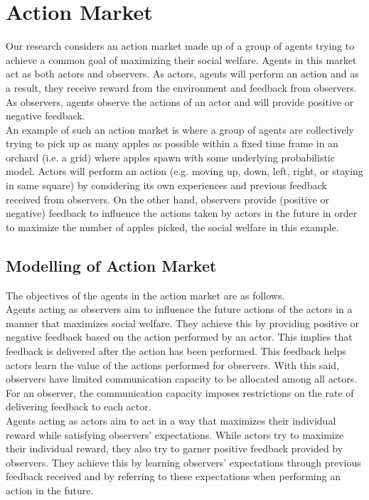 \section{Action Market}
\noindent Our research considers an action market made up of a group of agents trying to achieve a common goal of maximizing their social welfare. Agents in this market act as both actors and observers. As actors, agents will perform an action and as a result, they receive reward from the environment and feedback from observers. As observers, agents observe the actions of an actor and will provide positive or negative feedback. \\


\noindent An example of such an action market is where a group of agents are collectively trying to pick up as many apples as possible within a fixed time frame in an orchard (i.e. a grid) where apples spawn with some underlying probabilistic model. Actors will perform an action (e.g. moving up, down, left, right, or staying in same square) by considering its own experiences and previous feedback received from observers. On the other hand, observers provide (positive or negative) feedback to influence the actions taken by actors in the future in order to maximize the number of apples picked, the social welfare in this example. 

\subsection{Modelling of Action Market}

The objectives of the agents in the action market are as follows. \\

\noindent Agents acting as observers aim to influence the future actions of the actors in a manner that maximizes social welfare. They achieve this by providing positive or negative feedback based on the action performed by an actor. This implies that feedback is delivered after the action has been performed. This feedback helps actors learn the value of the actions performed for observers. With this said, observers have limited communication capacity to be allocated among all actors. For an observer, the communication capacity imposes restrictions on the rate of delivering feedback to each actor. \\ 

\noindent Agents acting as actors aim to act in a way that maximizes their individual reward while satisfying observers' expectations. While actors try to maximize their individual reward, they also try to garner positive feedback provided by observers. They achieve this by learning observers' expectations through previous feedback received and by referring to these expectations when performing an action in the future. \\

